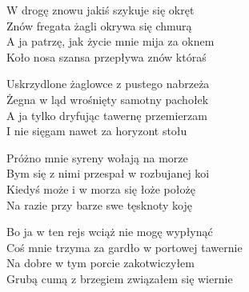\begin{text}
W drogę znowu jakiś szykuje się okręt\\
Znów fregata żagli okrywa się chmurą\\
A ja patrzę, jak życie mnie mija za oknem\\
Koło nosa szansa przepływa znów któraś

Uskrzydlone żaglowce z pustego nabrzeża\\
Żegna w ląd wrośnięty samotny pachołek\\
A ja tylko dryfując tawernę przemierzam\\
I nie sięgam nawet za horyzont stołu

Próżno mnie syreny wołają na morze\\
Bym się z nimi przespał w rozbujanej koi\\
Kiedyś może i w morza się łoże położę\\
Na razie przy barze swe tęsknoty koję

Bo ja w ten rejs wciąż nie mogę wypłynąć\\
Coś mnie trzyma za gardło w portowej tawernie\\
Na dobre w tym porcie zakotwiczyłem\\
Grubą cumą z brzegiem związałem się wiernie
\end{text}
\begin{chord}
\end{chord}
